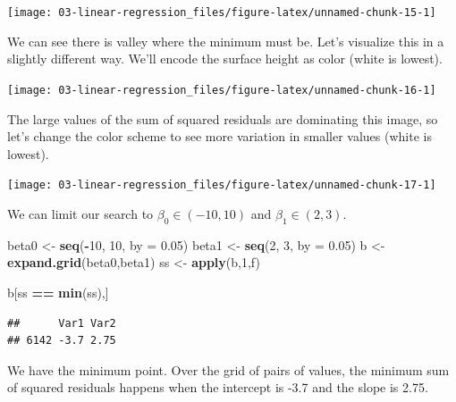 \documentclass[
]{book}
\newenvironment{Shaded}{\begin{snugshade}}{\end{snugshade}}
\newcommand{\DataTypeTok}[1]{\textcolor[rgb]{0.13,0.29,0.53}{#1}}
\newcommand{\DecValTok}[1]{\textcolor[rgb]{0.00,0.00,0.81}{#1}}
\newcommand{\FloatTok}[1]{\textcolor[rgb]{0.00,0.00,0.81}{#1}}
\newcommand{\KeywordTok}[1]{\textcolor[rgb]{0.13,0.29,0.53}{\textbf{#1}}}
\newcommand{\NormalTok}[1]{#1}
\newcommand{\OperatorTok}[1]{\textcolor[rgb]{0.81,0.36,0.00}{\textbf{#1}}}
\newcommand{\StringTok}[1]{\textcolor[rgb]{0.31,0.60,0.02}{#1}}
\begin{document}
\begin{center}\texttt{[image: 03-linear-regression\_files/figure-latex/unnamed-chunk-15-1]} \end{center}

We can see there is valley where the minimum must be. Let's visualize this in a slightly different way. We'll encode the surface height as color (white is lowest).

\begin{center}\texttt{[image: 03-linear-regression\_files/figure-latex/unnamed-chunk-16-1]} \end{center}

The large values of the sum of squared residuals are dominating this image, so let's change the color scheme to see more variation in smaller values (white is lowest).

\begin{center}\texttt{[image: 03-linear-regression\_files/figure-latex/unnamed-chunk-17-1]} \end{center}

We can limit our search to \(\beta_0 \in (-10,10)\) and \(\beta_1 \in (2,3)\).

\begin{Shaded}
\begin{Highlighting}[]
\NormalTok{beta0 <-}\StringTok{ }\KeywordTok{seq}\NormalTok{(}\OperatorTok{-}\DecValTok{10}\NormalTok{, }\DecValTok{10}\NormalTok{, }\DataTypeTok{by =} \FloatTok{0.05}\NormalTok{)}
\NormalTok{beta1 <-}\StringTok{ }\KeywordTok{seq}\NormalTok{(}\DecValTok{2}\NormalTok{, }\DecValTok{3}\NormalTok{, }\DataTypeTok{by =} \FloatTok{0.05}\NormalTok{)}
\NormalTok{b <-}\StringTok{ }\KeywordTok{expand.grid}\NormalTok{(beta0,beta1)}
\NormalTok{ss <-}\StringTok{ }\KeywordTok{apply}\NormalTok{(b,}\DecValTok{1}\NormalTok{,f)}

\NormalTok{b[ss }\OperatorTok{==}\StringTok{ }\KeywordTok{min}\NormalTok{(ss),]}
\end{Highlighting}
\end{Shaded}

\begin{verbatim}
##      Var1 Var2
## 6142 -3.7 2.75
\end{verbatim}

We have the minimum point. Over the grid of pairs of values, the minimum sum of squared residuals happens when the intercept is -3.7 and the slope is 2.75.
\end{document}
